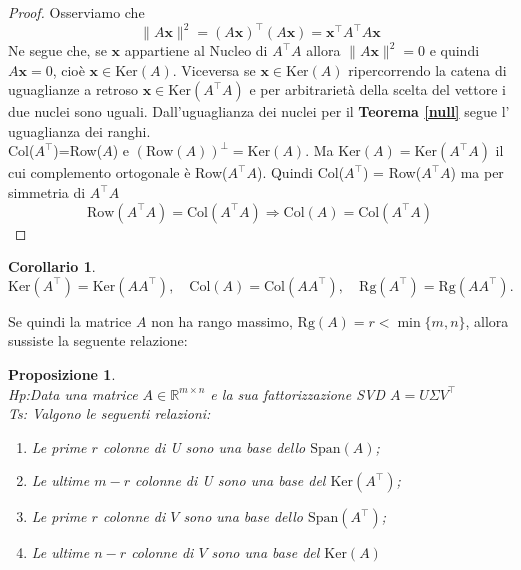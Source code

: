 \documentclass[11pt]{article}
\newtheorem{proposition}{Proposizione}
\newtheorem{corollary}{Corollario}
\newcommand{\R}{\mathbb{R}} %
\begin{document}
\begin{proof}
Osserviamo che
$$\|A\mathbf{x}\|^2=(A\mathbf{x})^\top      (A\mathbf{x})=\mathbf{x}^\top      A^\top      A\mathbf{x}$$
Ne segue che, se $\mathbf{x}$ appartiene al Nucleo di $A^\top      A$ allora $\|A\mathbf{x}\|^2=0$ e quindi $A\mathbf{x}=0$, cioè $\mathbf{x} \in \text{Ker}(A)$. Viceversa se $ \mathbf{x} \in \text{Ker}(A)$ ripercorrendo la catena di uguaglianze a retroso $\mathbf{x} \in \text{Ker}(A^\top      A)$ e per arbitrarietà della scelta del vettore i due nuclei sono uguali. Dall'uguaglianza dei nuclei per il \textbf{Teorema \ref{null}} segue l' uguaglianza dei ranghi. \\
Col($A^\top      $)=Row($A$) e $(\text{Row}(A))^\perp = \text{Ker}(A)$. Ma $\text{Ker}(A)=\text{Ker}(A^\top      A)$ il cui complemento ortogonale è Row($A^\top      A$). Quindi Col($A^\top      $) = Row($A^\top      A$) ma per simmetria di $A^\top      A$ 
\[
\text{Row}(A^\top      A)=\text{Col}(A^\top      A) \Rightarrow \text{Col}(A)=\text{Col}(A^\top      A)
\] 
\end{proof}
\begin{corollary}\label{cor:A}
\[
\text{Ker}(A^\top      ) = \text{Ker}(AA^\top      ), \quad \text{Col}(A) = \text{Col}(AA^\top      ), \quad \text{Rg}(A^\top      ) = \text{Rg}(AA^\top      ).
\]
\end{corollary}
\noindent
Se quindi la matrice $A$ non ha rango massimo, $\text{Rg}(A)= r < \min{\{m,n\}}$, allora sussiste la seguente relazione:
\begin{proposition}\label{prop: span}
\textbf{}\\
\textit{Hp:}Data una matrice $A \in \R^{m \times n}$ e la sua fattorizzazione SVD $A=U\Sigma V^\top      $\\
\textit{Ts:} Valgono le seguenti relazioni:
\begin{enumerate}
	\item Le prime $r$ colonne di U sono una base dello $\text{Span}(A)$;
	\item Le ultime $m-r$ colonne di U sono una base del $\text{Ker}(A^\top      )$;
	\item Le prime $r$ colonne di $V$ sono una base dello $\text{Span}(A^\top      )$;
	\item Le ultime $n-r$ colonne di $V$ sono una base del $\text{Ker}(A)$
\end{enumerate} 
\end{proposition}
\end{document}
